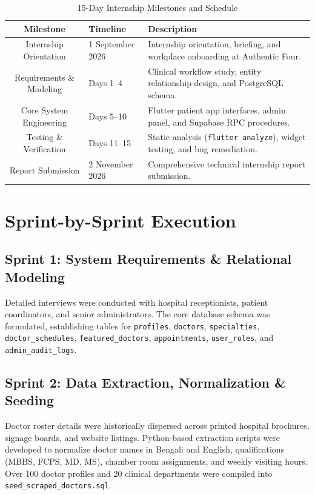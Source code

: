 \documentclass[11pt,a4paper,oneside]{report}
\begin{document}
\begin{table}[H]
\centering
\small
\begin{tabularx}{\textwidth}{clX}
\toprule
\textbf{Milestone} & \textbf{Timeline} & \textbf{Description} \\
\midrule
Internship Orientation & 1 September 2026 & Internship orientation, briefing, and workplace onboarding at Authentic Four. \\
Requirements \& Modeling & Days 1--4 & Clinical workflow study, entity relationship design, and PostgreSQL schema. \\
Core System Engineering & Days 5--10 & Flutter patient app interfaces, admin panel, and Supabase RPC procedures. \\
Testing \& Verification & Days 11--15 & Static analysis (\texttt{flutter analyze}), widget testing, and bug remediation. \\
Report Submission & 2 November 2026 & Comprehensive technical internship report submission. \\
\bottomrule
\end{tabularx}
\caption{15-Day Internship Milestones and Schedule}
\label{tab:sprints}
\end{table}

\section{Sprint-by-Sprint Execution}

\subsection{Sprint 1: System Requirements \& Relational Modeling}
Detailed interviews were conducted with hospital receptionists, patient coordinators, and senior administrators. The core database schema was formulated, establishing tables for \texttt{profiles}, \texttt{doctors}, \texttt{specialties}, \texttt{doctor\_schedules}, \texttt{featured\_doctors}, \texttt{appointments}, \texttt{user\_roles}, and \texttt{admin\_audit\_logs}.

\subsection{Sprint 2: Data Extraction, Normalization \& Seeding}
Doctor roster details were historically dispersed across printed hospital brochures, signage boards, and website listings. Python-based extraction scripts were developed to normalize doctor names in Bengali and English, qualifications (MBBS, FCPS, MD, MS), chamber room assignments, and weekly visiting hours. Over 100 doctor profiles and 20 clinical departments were compiled into \texttt{seed\_scraped\_doctors.sql}.
\end{document}
